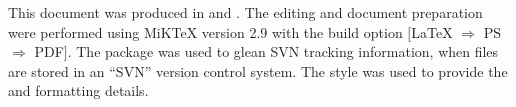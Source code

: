 This document was produced in \LaTeXx and \Biberx.
The editing and document preparation were performed using MiK\TeX{} version 2.9  with the build option $[$\LaTeX{}  $\Rightarrow$ PS $\Rightarrow$ PDF$]$.
The  package was used to glean SVN tracking information, when files are stored in an ``SVN'' version control system.
The style {\tt \KNEADdocumentClsName}
was used to provide the \LaTeXx and \Biberx formatting details.